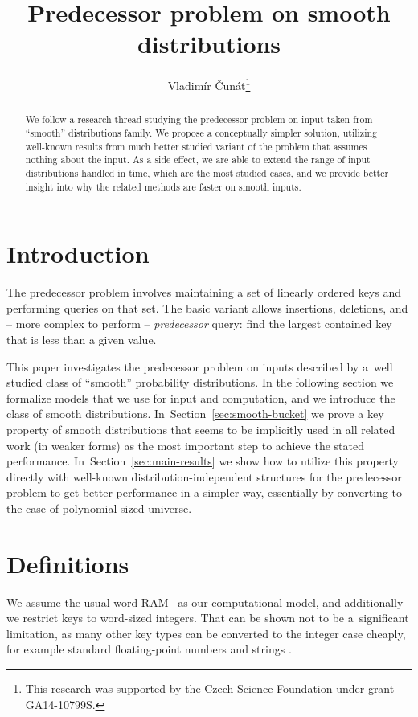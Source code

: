 \documentclass[
submission
, nomarks
]{dmtcs-episciences}
\title{Predecessor problem on smooth distributions}
\affiliation{
Faculty of Mathematics and Physics, Charles University in Prague, Czech Republic \\
  CZ.NIC, z.\,s.\,p.\,o.
}
\author{Vladim\'ir \v{C}un\'at\affiliationmark{1,2}\thanks{This research was supported by the Czech Science Foundation under grant GA14-10799S.}
}
\theoremstyle{plain}
\theoremstyle{definition}
\theoremstyle{remark}
\theoremstyle{plain}
\theoremstyle{plain}
\begin{document}
\maketitle

\begin{abstract}
We follow a research thread studying the predecessor problem on input
taken from ``smooth'' distributions family. We propose a conceptually
simpler solution, utilizing well-known results from much better studied
variant of the problem that assumes nothing about the input. As a
side effect, we are able to extend the range of input distributions
handled in  time, which are the most
studied cases, and we provide better insight into why the related
methods are faster on smooth inputs.
\end{abstract}





\section{Introduction}

The predecessor problem involves maintaining a set of linearly
ordered keys and performing queries on that set. The basic variant allows insertions, deletions, and -- more complex to perform -- \emph{predecessor} query: find the largest contained key that is less than a given value. 

This paper investigates the predecessor problem on inputs described by  a~well studied class of ``smooth'' probability distributions.
In the following section we formalize models that we use for input and computation,
and we introduce the class of smooth distributions. In~Section~\ref{sec:smooth-bucket} we
prove a key property of smooth distributions that seems to be
implicitly used in all related work (in weaker forms) as the most
important step to achieve the stated performance. In~Section~\ref{sec:main-results}
we show how to utilize this property directly with well-known distribution-independent
structures for the predecessor problem to get better performance in
a simpler way, essentially by converting to the case of polynomial-sized
universe.

\section{Definitions \label{sec:defs}}

We assume the usual word-RAM~\cite{HagerupT98}
as our computational model, and additionally we restrict keys to word-sized
integers. That can be shown not to be a~significant limitation, as
many other key types can be converted to the integer case cheaply,
for example standard floating-point numbers \cite[sec. 2.1.3]{Goldberg91}
and strings \cite{AndersT01}.
\end{document}
